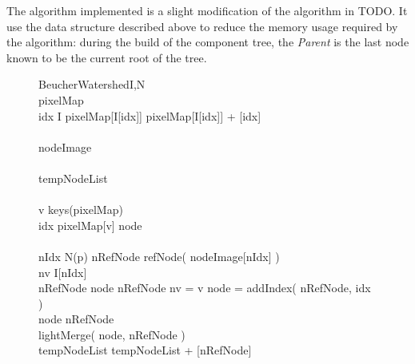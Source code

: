 \documentclass{InsightArticle}
\begin{document}
The algorithm implemented is a slight modification of the algorithm in TODO. It use the data structure described above to reduce the memory usage required by the algorithm: during the build of the component tree, the {\em Parent} is the last node known to be the current root of the tree.

\begin{figure}[htbp]
\centering
\small
\begin{pseudocode}[framebox]{BeucherWatershed}{I,N}
\\
pixelMap \GETS \emptyset \\
\FOREACH idx \in I \DO
  pixelMap[I[idx]] \GETS pixelMap[I[idx]] + [idx] \\
\\
nodeImage \GETS \emptyset \\
\\
tempNodeList \GETS \emptyset \\
\\
\FOREACH v \in keys(pixelMap) \DO
\BEGIN
  \\
  \FOREACH idx \in pixelMap[v] \DO
  \BEGIN
    node \GETS \emptyset \\
    \\
    \FOREACH nIdx \in N(p) \DO
    \BEGIN
      nRefNode \GETS refNode( nodeImage[nIdx] ) \\
      nv \GETS I[nIdx] \\
      \IF nRefNode \neq \emptyset \AND node \neq nRefNode \AND nv = v
        \THEN
          \BEGIN
            \IF node = \emptyset
              \THEN
                \BEGIN
                  addIndex( nRefNode, idx ) \\
                  node \GETS nRefNode \\
                \END
              \ELSE
                \BEGIN
                  lightMerge( node, nRefNode ) \\
                  tempNodeList \GETS tempNodeList + [nRefNode] \\
                \END
          \END
    \END \\
    
  \END \\
\END \\


\end{pseudocode}
\end{figure}
\end{document}
